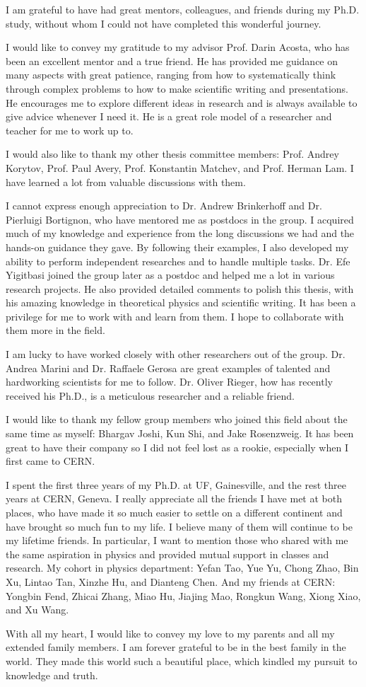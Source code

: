 
\hspace{2em} I am grateful to have had great mentors, colleagues, and friends during my Ph.D. study,
without whom I could not have completed this wonderful journey.

I would like to convey my gratitude to my advisor Prof. Darin Acosta,
who has been an excellent mentor and a true friend.
He has provided me guidance on many aspects with great patience, 
ranging from how to systematically think through complex problems 
to how to make scientific writing and presentations.
He encourages me to explore different ideas in research and is always available to give advice whenever I need it.
He is a great role model of a researcher and teacher for me to work up to.

I would also like to thank my other thesis committee members:
Prof. Andrey Korytov, Prof. Paul Avery, Prof. Konstantin Matchev, and Prof. Herman Lam.
I have learned a lot from valuable discussions with them.

I cannot express enough appreciation to Dr. Andrew Brinkerhoff and Dr. Pierluigi Bortignon,
who have mentored me as postdocs in the group.
I acquired much of my knowledge and experience from the long discussions we had and the hands-on guidance they gave.
By following their examples, I also developed my ability to perform independent researches and to handle multiple tasks.
Dr. Efe Yigitbasi joined the group later as a postdoc and helped me a lot in various research projects.
He also provided detailed comments to polish this thesis, with his amazing knowledge in theoretical physics and scientific writing.
It has been a privilege for me to work with and learn from them.
I hope to collaborate with them more in the field. 

I am lucky to have worked closely with other researchers out of the group.
Dr. Andrea Marini and Dr. Raffaele Gerosa are great examples of talented and hardworking scientists for me to follow.
Dr. Oliver Rieger, how has recently received his Ph.D., is a meticulous researcher and a reliable friend. 

I would like to thank my fellow group members who joined this field about the same time as myself:
Bhargav Joshi, Kun Shi, and Jake Rosenzweig.
It has been great to have their company so I did not feel lost as a rookie, especially when I first came to CERN. 

I spent the first three years of my Ph.D. at UF, Gainesville, and the rest three years at CERN, Geneva.
I really appreciate all the friends I have met at both places, 
who have made it so much easier to settle on a different continent and have brought so much fun to my life.
I believe many of them will continue to be my lifetime friends.
In particular, I want to mention those who shared with me the same aspiration in physics and provided mutual support in classes and research.
My cohort in physics department: Yefan Tao, Yue Yu, Chong Zhao, Bin Xu, Lintao Tan, Xinzhe Hu, and Dianteng Chen.
And my friends at CERN: Yongbin Fend, Zhicai Zhang, Miao Hu, Jiajing Mao, Rongkun Wang, Xiong Xiao, and Xu Wang.

With all my heart, I would like to convey my love to my parents and all my extended family members.
I am forever grateful to be in the best family in the world.
They made this world such a beautiful place, which kindled my pursuit to knowledge and truth.
